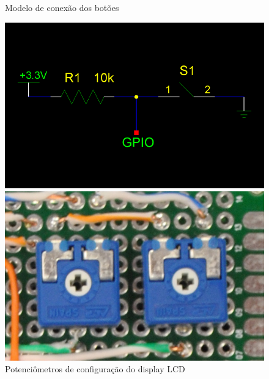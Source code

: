 \begin{figure}[htb]
	\centering
 	\begin{minipage}{0.45\textwidth}
		\centering
		\caption{\label{fig:push-btn-sketch}Modelo de conexão dos botões}
		\includegraphics[width=1\textwidth]{img/push-btn-sketch.png}
	\end{minipage}
	\hfill
	\begin{minipage}{0.45\textwidth}
		\centering
		\caption{\label{fig:potentiometer}Potenciômetros de configuração do display LCD}
		\includegraphics[width=1\textwidth]{img/potentiometer.jpg}
	\end{minipage}
\end{figure}

